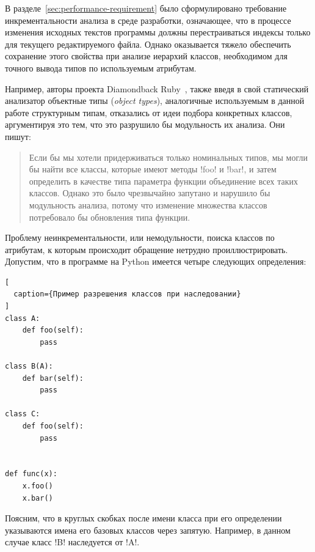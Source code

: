 В разделе~\ref{sec:performance-requirement} было сформулировано требование
инкрементальности анализа в среде разработки, означающее, что в процессе
изменения исходных текстов программы должны перестраиваться индексы только для
текущего редактируемого файла. Однако оказывается тяжело обеспечить сохранение этого
свойства при анализе иерархий классов, необходимом для точного вывода типов по
используемым атрибутам.

Например, авторы проекта Diamondback Ruby~\cite{Furr2009}, также введя в свой
статический анализатор объектные типы (\emph{object types}), аналогичные
используемым в данной работе структурным типам, отказались от идеи
подбора конкретных классов, аргументируя это тем, что это разрушило бы
модульность их анализа. Они пишут:

\begin{quote}
  Если бы мы хотели придерживаться только номинальных типов, мы могли бы найти
  все классы, которые имеют методы !foo! и !bar!, и затем определить в качестве
  типа параметра функции объединение всех таких классов. Однако это было чрезвычайно
  запутано и нарушило бы модульность анализа, потому что изменение множества
  классов потребовало бы обновления типа функции.

\end{quote}

Проблему неинкрементальности, или немодульности, поиска классов по атрибутам, к
которым происходит обращение нетрудно проиллюстрировать. Допустим, что в
программе на Python имеется четыре следующих определения:

\begin{lstlisting}[
  caption={Пример разрешения классов при наследовании}
]
class A:
    def foo(self):
        pass

class B(A):
    def bar(self):
        pass

class C:
    def foo(self):
        pass


def func(x):
    x.foo()
    x.bar()

\end{lstlisting}

Поясним, что в круглых скобках после имени класса при его определении
указываются имена его базовых классов через запятую. Например, в данном случае
класс !B! наследуется от !A!.

